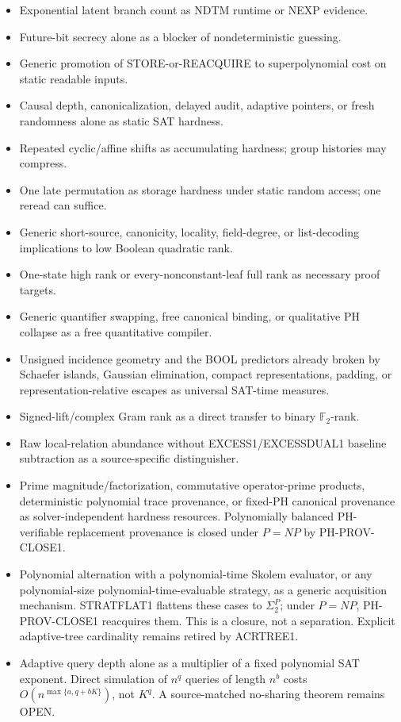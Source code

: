 \documentclass[11pt]{article}
\begin{document}
\begin{itemize}
\item Exponential latent branch count as NDTM runtime or NEXP evidence.
\item Future-bit secrecy alone as a blocker of nondeterministic guessing.
\item Generic promotion of STORE-or-REACQUIRE to superpolynomial cost on static readable inputs.
\item Causal depth, canonicalization, delayed audit, adaptive pointers, or fresh randomness alone as
static SAT hardness.
\item Repeated cyclic/affine shifts as accumulating hardness; group histories may compress.
\item One late permutation as storage hardness under static random access; one reread can suffice.
\item Generic short-source, canonicity, locality, field-degree, or list-decoding implications to low
Boolean quadratic rank.
\item One-state high rank or every-nonconstant-leaf full rank as necessary proof targets.
\item Generic quantifier swapping, free canonical binding, or qualitative PH collapse as a free
quantitative compiler.
\item Unsigned incidence geometry and the BOOL predictors already broken by Schaefer islands,
Gaussian elimination, compact representations, padding, or representation-relative escapes as
universal SAT-time measures.
\item Signed-lift/complex Gram rank as a direct transfer to binary \(\mathbb F_2\)-rank.
\item Raw local-relation abundance without EXCESS1/EXCESSDUAL1 baseline subtraction as a source-specific distinguisher.
\item Prime magnitude/factorization, commutative operator-prime products, deterministic polynomial
trace provenance, or fixed-PH canonical provenance as solver-independent hardness resources.
Polynomially balanced PH-verifiable replacement provenance is closed under \(P=NP\) by PH-PROV-CLOSE1.
\item Polynomial alternation with a polynomial-time Skolem evaluator, or any polynomial-size
polynomial-time-evaluable strategy, as a generic acquisition mechanism. STRATFLAT1 flattens these
cases to \(\Sigma_2^P\); under \(P=NP\), PH-PROV-CLOSE1 reacquires them. This is a closure, not a
separation. Explicit adaptive-tree cardinality remains retired by ACRTREE1.
\item Adaptive query depth alone as a multiplier of a fixed polynomial SAT exponent. Direct
simulation of \(n^q\) queries of length \(n^b\) costs \(O(n^{\max\{a,q+bK\}})\), not \(K^q\). A
source-matched no-sharing theorem remains OPEN.
\end{itemize}
\end{document}

